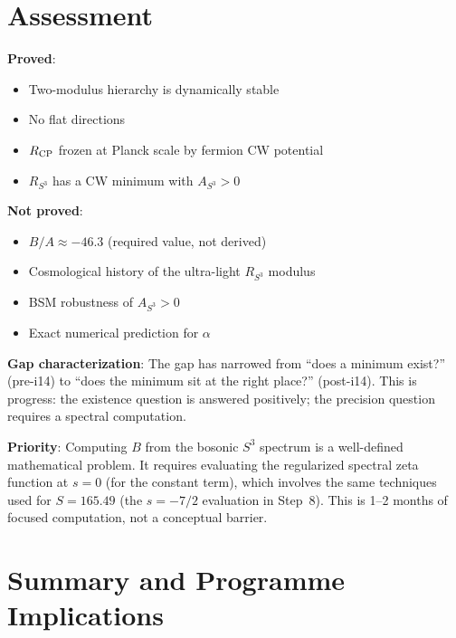 \documentclass[11pt]{article}
\begin{document}
\section{Assessment}

\begin{tcolorbox}[colback=orange!5!white, colframe=orange!60!black,
  title=\textbf{$\alpha^{57}$ Step 9 Status: CONDITIONALLY CLOSED}]

\textbf{Proved}:
\begin{itemize}[nosep]
\item Two-modulus hierarchy is dynamically stable
\item No flat directions
\item $R_{\rm CP}$ frozen at Planck scale by fermion CW potential
\item $R_{S^3}$ has a CW minimum with $A_{S^3} > 0$
\end{itemize}

\textbf{Not proved}:
\begin{itemize}[nosep]
\item $B/A \approx -46.3$ (required value, not derived)
\item Cosmological history of the ultra-light $R_{S^3}$ modulus
\item BSM robustness of $A_{S^3} > 0$
\item Exact numerical prediction for $\alpha$
\end{itemize}

\textbf{Gap characterization}: The gap has narrowed from ``does a
minimum exist?'' (pre-i14) to ``does the minimum sit at the right
place?'' (post-i14). This is progress: the existence question is
answered positively; the precision question requires a spectral
computation.

\textbf{Priority}: Computing $B$ from the bosonic $S^3$ spectrum
is a well-defined mathematical problem. It requires evaluating
the regularized spectral zeta function at $s = 0$ (for the constant
term), which involves the same techniques used for $S = 165.49$
(the $s = -7/2$ evaluation in Step~8). This is 1--2 months of
focused computation, not a conceptual barrier.
\end{tcolorbox}


\section*{Summary and Programme Implications}
\end{document}
